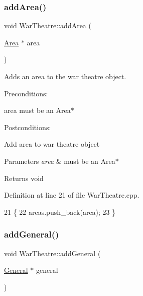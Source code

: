 \subsubsection{\texorpdfstring{add\+Area()}{addArea()}}
{\footnotesize\ttfamily void War\+Theatre\+::add\+Area (\begin{DoxyParamCaption}\item[{\hyperlink{classArea}{Area} $\ast$}]{area }\end{DoxyParamCaption})}



Adds an area to the war theatre object. 

Preconditions\+:
\begin{DoxyItemize}
\item area must be an Area$\ast$
\end{DoxyItemize}

Postconditions\+:
\begin{DoxyItemize}
\item Add area to war theatre object
\end{DoxyItemize}


\begin{DoxyParams}{Parameters}
{\em area} & must be an Area$\ast$ \\
\hline
\end{DoxyParams}
\begin{DoxyReturn}{Returns}
void 
\end{DoxyReturn}


Definition at line 21 of file War\+Theatre.\+cpp.


\begin{DoxyCode}
21                                    \{
22     areas.push\_back(area);
23 \}
\end{DoxyCode}
\mbox{\label{classWarTheatre_a1a8640cb110c90f2f2619344fc16a15e}} 
\subsubsection{\texorpdfstring{add\+General()}{addGeneral()}}
{\footnotesize\ttfamily void War\+Theatre\+::add\+General (\begin{DoxyParamCaption}\item[{\hyperlink{classGeneral}{General} $\ast$}]{general }\end{DoxyParamCaption})\hspace{0.3cm}{\ttfamily [virtual]}}



